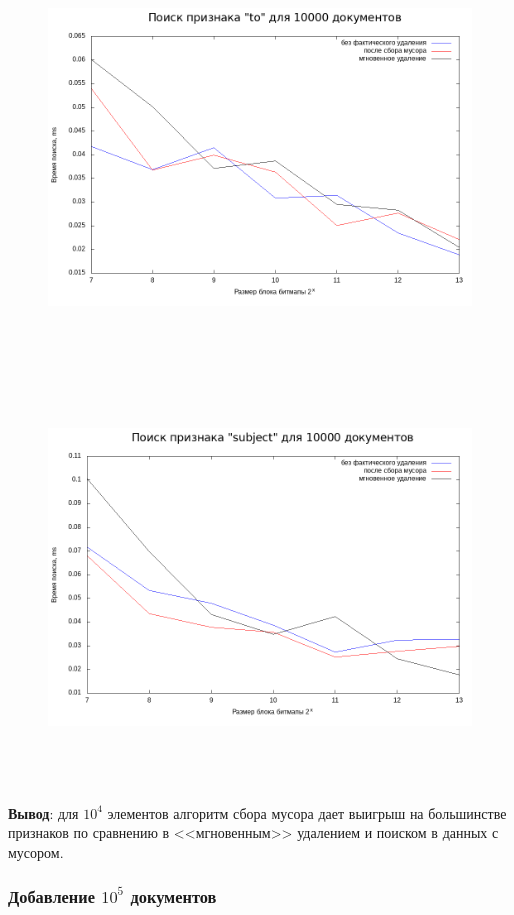 \begin{figure}[H]
\includegraphics[width=\linewidth, height=11cm]{fig/limit_1/1e4/to_time.png}
\includegraphics[width=\linewidth, height=11cm]{fig/limit_1/1e4/subject_time.png}
\end{figure}

\textbf{Вывод}: для $10^4$ элементов алгоритм сбора мусора дает выигрыш на большинстве признаков
по сравнению в <<мгновенным>> удалением и поиском в данных с мусором.

\subsubsection{Добавление $10^5$ документов}

